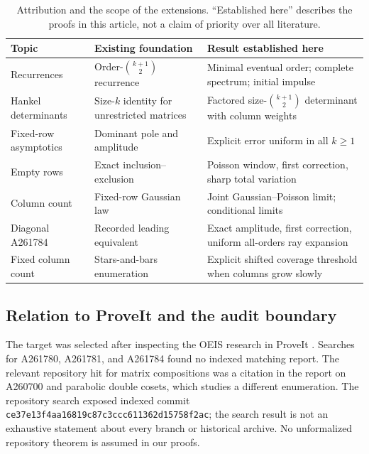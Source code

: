 \documentclass[11pt]{article}
\numberwithin{equation}{section}
\theoremstyle{definition}
\theoremstyle{remark}
\begin{document}
\begin{table}[ht]
\centering\small
\begin{tabular}{@{}>{\raggedright\arraybackslash}p{}>{\raggedright\arraybackslash}p{}>{\raggedright\arraybackslash}p{}@{}}
\toprule
Topic & Existing foundation & Result established here\\
\midrule
Recurrences & Order-$\binom{k+1}{2}$ recurrence & Minimal eventual order; complete spectrum; initial impulse\\
Hankel determinants & Size-$k$ identity for unrestricted matrices & Factored size-$\binom{k+1}{2}$ determinant with column weights\\
Fixed-row asymptotics & Dominant pole and amplitude & Explicit error uniform in all $k\ge1$\\
Empty rows & Exact inclusion--exclusion & Poisson window, first correction, sharp total variation\\
Column count & Fixed-row Gaussian law & Joint Gaussian--Poisson limit; conditional limits\\
Diagonal A261784 & Recorded leading equivalent & Exact amplitude, first correction, uniform all-orders ray expansion\\
Fixed column count & Stars-and-bars enumeration & Explicit shifted coverage threshold when columns grow slowly\\
\bottomrule
\end{tabular}
\caption{Attribution and the scope of the extensions. ``Established here'' describes the proofs in this article, not a claim of priority over all literature.}
\label{mxc:tab:scope}
\end{table}

\subsection{Relation to ProveIt and the audit boundary}
The target was selected after inspecting the OEIS research in ProveIt
\cite{proveit}. Searches for A261780, A261781, and A261784 found no indexed
matching report. The relevant repository hit for matrix compositions was
a citation in the report on A260700 and parabolic double cosets, which
studies a different enumeration. The repository search exposed indexed
commit \texttt{ce37e13f4aa16819c87c3ccc611362d15758f2ac}; the search result
is not an exhaustive statement about every branch or historical archive.
No unformalized repository theorem is assumed in our proofs.
\end{document}
